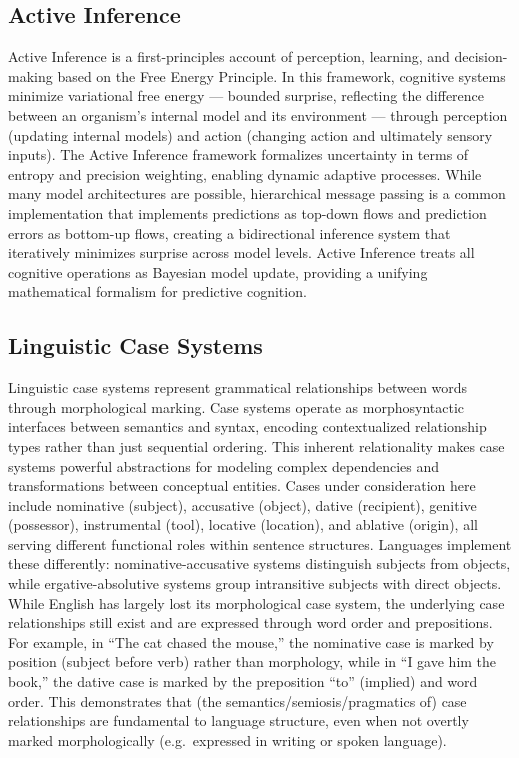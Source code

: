 \hypertarget{active-inference}{%
\subsection{Active Inference}\label{active-inference}}

Active Inference is a first-principles account of perception, learning,
and decision-making based on the Free Energy Principle. In this
framework, cognitive systems minimize variational free energy ---
bounded surprise, reflecting the difference between an organism's
internal model and its environment --- through perception (updating
internal models) and action (changing action and ultimately sensory
inputs). The Active Inference framework formalizes uncertainty in terms
of entropy and precision weighting, enabling dynamic adaptive processes.
While many model architectures are possible, hierarchical message
passing is a common implementation that implements predictions as
top-down flows and prediction errors as bottom-up flows, creating a
bidirectional inference system that iteratively minimizes surprise
across model levels. Active Inference treats all cognitive operations as
Bayesian model update, providing a unifying mathematical formalism for
predictive cognition.

\hypertarget{linguistic-case-systems}{%
\subsection{Linguistic Case Systems}\label{linguistic-case-systems}}

Linguistic case systems represent grammatical relationships between
words through morphological marking. Case systems operate as
morphosyntactic interfaces between semantics and syntax, encoding
contextualized relationship types rather than just sequential ordering.
This inherent relationality makes case systems powerful abstractions for
modeling complex dependencies and transformations between conceptual
entities. Cases under consideration here include nominative (subject),
accusative (object), dative (recipient), genitive (possessor),
instrumental (tool), locative (location), and ablative (origin), all
serving different functional roles within sentence structures. Languages
implement these differently: nominative-accusative systems distinguish
subjects from objects, while ergative-absolutive systems group
intransitive subjects with direct objects. While English has largely
lost its morphological case system, the underlying case relationships
still exist and are expressed through word order and prepositions. For
example, in ``The cat chased the mouse,'' the nominative case is marked
by position (subject before verb) rather than morphology, while in ``I
gave him the book,'' the dative case is marked by the preposition ``to''
(implied) and word order. This demonstrates that (the
semantics/semiosis/pragmatics of) case relationships are fundamental to
language structure, even when not overtly marked morphologically
(e.g.~expressed in writing or spoken language).


